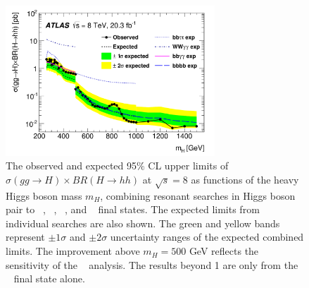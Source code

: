 \begin{figure}[htbp!]
  \centering
  \includegraphics[width=0.7\textwidth]{figures/theory/Run1_ATLAS}
  \caption{The observed and expected 95$\%$ CL upper limits of $\sigma(gg \to H) \times BR(H \to hh)$ at $\sqrt{s}=8$ \TeV as functions of the heavy Higgs boson mass $m_{H}$, combining resonant searches in Higgs boson pair to \bbtautau~, \WWgg~, \bbgg~, and \bbbb~ final states. The expected limits from individual searches are also shown. The green and yellow bands represent $\pm 1\sigma$ and $\pm 2\sigma$ uncertainty ranges of the expected combined limits. The improvement above $m_{H} =500$ GeV reflects the sensitivity of the \bbbb~ analysis. The results beyond 1 \TeV are only from the \bbbb~ final state alone.}
  \label{fig:Run1_ATLAS}
\end{figure}

